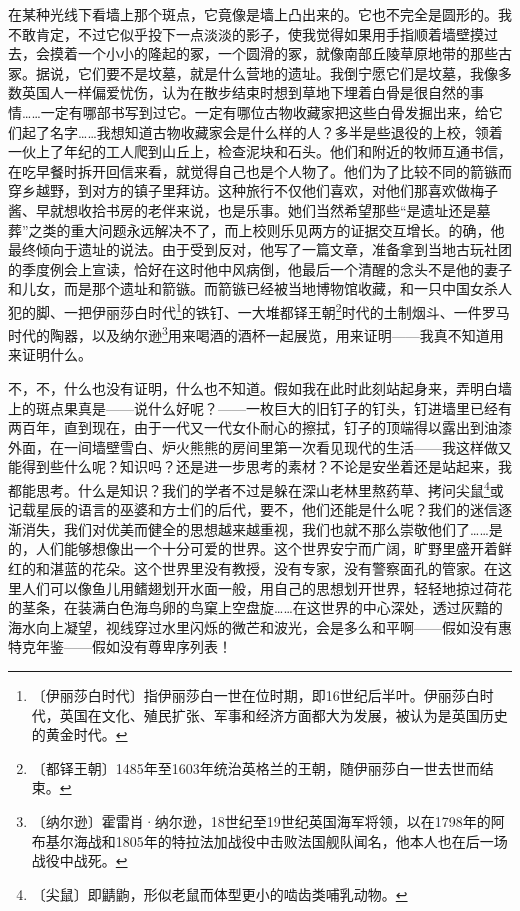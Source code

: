 \documentclass[12pt,UTF-8,openany]{ctexbook}
\begin{document}
\begin{large}
    在某种光线下看墙上那个斑点，它竟像是墙上凸出来的。它也不完全是圆形的。我不敢肯定，不过它似乎投下一点淡淡的影子，使我觉得如果用手指顺着墙壁摸过去，会摸着一个小小的隆起的冢，一个圆滑的冢，就像南部丘陵草原地带的那些古冢。据说，它们要不是坟墓，就是什么营地的遗址。我倒宁愿它们是坟墓，我像多数英国人一样偏爱忧伤，认为在散步结束时想到草地下埋着白骨是很自然的事情……一定有哪部书写到过它。一定有哪位古物收藏家把这些白骨发掘出来，给它们起了名字……我想知道古物收藏家会是什么样的人？多半是些退役的上校，领着一伙上了年纪的工人爬到山丘上，检查泥块和石头。他们和附近的牧师互通书信，在吃早餐时拆开回信来看，就觉得自己也是个人物了。他们为了比较不同的箭镞而穿乡越野，到对方的镇子里拜访。这种旅行不仅他们喜欢，对他们那喜欢做梅子酱、早就想收拾书房的老伴来说，也是乐事。她们当然希望那些“是遗址还是墓葬”之类的重大问题永远解决不了，而上校则乐见两方的证据交互增长。的确，他最终倾向于遗址的说法。由于受到反对，他写了一篇文章，准备拿到当地古玩社团的季度例会上宣读，恰好在这时他中风病倒，他最后一个清醒的念头不是他的妻子和儿女，而是那个遗址和箭镞。而箭镞已经被当地博物馆收藏，和一只中国女杀人犯的脚、一把伊丽莎白时代\footnote{〔伊丽莎白时代〕指伊丽莎白一世在位时期，即16世纪后半叶。伊丽莎白时代，英国在文化、殖民扩张、军事和经济方面都大为发展，被认为是英国历史的黄金时代。}的铁钉、一大堆都铎王朝\footnote{〔都铎王朝〕1485年至1603年统治英格兰的王朝，随伊丽莎白一世去世而结束。}时代的土制烟斗、一件罗马时代的陶器，以及纳尔逊\footnote{〔纳尔逊〕霍雷肖·纳尔逊，18世纪至19世纪英国海军将领，以在1798年的阿布基尔海战和1805年的特拉法加战役中击败法国舰队闻名，他本人也在后一场战役中战死。}用来喝酒的酒杯一起展览，用来证明——我真不知道用来证明什么。
    
    不，不，什么也没有证明，什么也不知道。假如我在此时此刻站起身来，弄明白墙上的斑点果真是——说什么好呢？——一枚巨大的旧钉子的钉头，钉进墙里已经有两百年，直到现在，由于一代又一代女仆耐心的擦拭，钉子的顶端得以露出到油漆外面，在一间墙壁雪白、炉火熊熊的房间里第一次看见现代的生活——我这样做又能得到些什么呢？知识吗？还是进一步思考的素材？不论是安坐着还是站起来，我都能思考。什么是知识？我们的学者不过是躲在深山老林里熬药草、拷问尖鼠\footnote{〔尖鼠〕即鼱鼩，形似老鼠而体型更小的啮齿类哺乳动物。}或记载星辰的语言的巫婆和方士们的后代，要不，他们还能是什么呢？我们的迷信逐渐消失，我们对优美而健全的思想越来越重视，我们也就不那么崇敬他们了……是的，人们能够想像出一个十分可爱的世界。这个世界安宁而广阔，旷野里盛开着鲜红的和湛蓝的花朵。这个世界里没有教授，没有专家，没有警察面孔的管家。在这里人们可以像鱼儿用鳍翅划开水面一般，用自己的思想划开世界，轻轻地掠过荷花的茎条，在装满白色海鸟卵的鸟窠上空盘旋……在这世界的中心深处，透过灰黯的海水向上凝望，视线穿过水里闪烁的微芒和波光，会是多么和平啊——假如没有惠特克年鉴——假如没有尊卑序列表！
    

\end{large}
\end{document}
